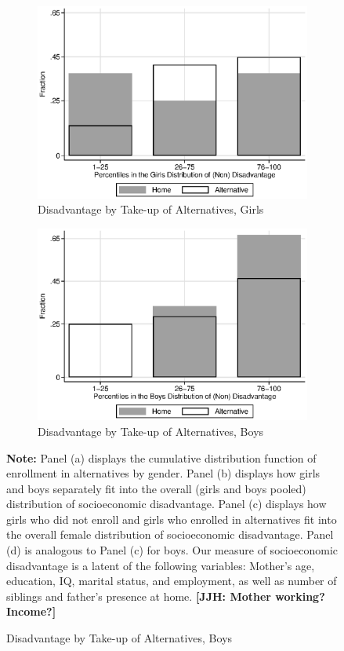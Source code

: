 \begin{figure}
\begin{subfigure}[h]{0.4\textwidth}
\end{subfigure}
\begin{subfigure}[h]{0.4\textwidth}
	\centering
	\caption{Disadvantage by Take-up of Alternatives, Girls} \label{figure:disadgirls}
	\includegraphics[width=\textwidth]{output/factorbase_wgirlscompare}
\end{subfigure}%
\begin{subfigure}[h]{0.4\textwidth}
	\centering
	\caption{Disadvantage by Take-up of Alternatives, Boys} \label{figure:disadboys}
	\includegraphics[width=\textwidth]{output/factorbase_wboyscompare}
\end{subfigure}
\footnotesize
\justify
\textbf{Note:} Panel (a) displays the cumulative distribution function of enrollment in alternatives by gender. Panel (b) displays how girls and boys separately fit into the overall (girls and boys pooled) distribution of socioeconomic disadvantage. Panel (c) displays how girls who did not enroll and girls who enrolled in alternatives fit into the overall female distribution of socioeconomic disadvantage. Panel (d) is analogous to Panel (c) for boys. Our measure of socioeconomic disadvantage is a latent of the following variables: Mother's age, education, IQ, marital status, and employment, as well as number of siblings and father's presence at home.
\textbf{[JJH: Mother working? Income?]}
\end{figure}

